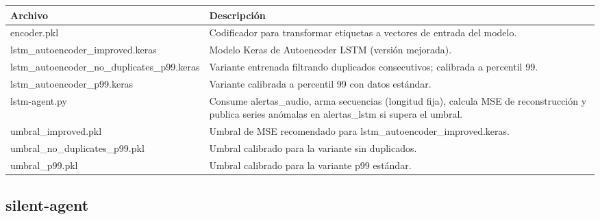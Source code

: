 \begin{table}[H]
  \doublespacing
  \begin{tabularx}{\textwidth}{l X}
    \hline
    \textbf{Archivo}                             & \textbf{Descripción}                                                                                                                                   \\
    \hline
    encoder.pkl                                  & Codificador para transformar etiquetas a vectores de entrada del modelo.                                                                               \\
    lstm\_autoencoder\_improved.keras            & Modelo Keras de Autoencoder LSTM (versión mejorada).                                                                                                   \\
    lstm\_autoencoder\_no\_duplicates\_p99.keras & Variante entrenada filtrando duplicados consecutivos; calibrada a percentil 99.                                                                        \\
    lstm\_autoencoder\_p99.keras                 & Variante calibrada a percentil 99 con datos estándar.                                                                                                  \\
    lstm-agent.py                                & Consume alertas\_audio, arma secuencias (longitud fija), calcula MSE de reconstrucción y publica series anómalas en alertas\_lstm si supera el umbral. \\
    umbral\_improved.pkl                         & Umbral de MSE recomendado para lstm\_autoencoder\_improved.keras.                                                                                      \\
    umbral\_no\_duplicates\_p99.pkl              & Umbral calibrado para la variante sin duplicados.                                                                                                      \\
    umbral\_p99.pkl                              & Umbral calibrado para la variante p99 estándar.                                                                                                        \\
    \hline
  \end{tabularx}
\end{table}

\subsection*{silent-agent}

